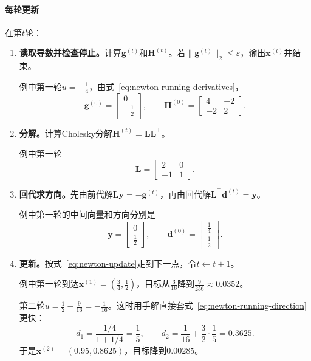 \paragraph{每轮更新}
在第$t$轮：
\begin{enumerate}
 \item \textbf{读取导数并检查停止。}计算$\bm{g}^{(t)}$和$\bm{H}^{(t)}$。若$\lVert\bm{g}^{(t)}\rVert_2\leq\varepsilon$，输出$\bm{x}^{(t)}$并结束。

 例中第一轮$u=-\tfrac14$，由式~\eqref{eq:newton-running-derivatives}，
 \[
  \bm{g}^{(0)}=\begin{bmatrix}0\\-\tfrac12\end{bmatrix},\qquad
  \bm{H}^{(0)}=\begin{bmatrix}4&-2\\-2&2\end{bmatrix}.
 \]

 \item \textbf{分解。}计算Cholesky分解$\bm{H}^{(t)}=\bm{L}\bm{L}^\top$。

 例中第一轮
 \[
  \bm{L}=\begin{bmatrix}2&0\\-1&1\end{bmatrix}.
 \]

 \item \textbf{回代求方向。}先由前代解$\bm{L}\bm{y}=-\bm{g}^{(t)}$，再由回代解$\bm{L}^\top\bm{d}^{(t)}=\bm{y}$。

 例中第一轮的中间向量和方向分别是
 \[
  \bm{y}=\begin{bmatrix}0\\\tfrac12\end{bmatrix},\qquad
  \bm{d}^{(0)}=\begin{bmatrix}\tfrac14\\\tfrac12\end{bmatrix}.
 \]

 \item \textbf{更新。}按式~\eqref{eq:newton-update}走到下一点，令$t\leftarrow t+1$。

 例中第一轮到达$\bm{x}^{(1)}=(\tfrac34,\tfrac12)$，目标从$\tfrac3{16}$降到$\tfrac9{256}\approx0.0352$。

 第二轮$u=\tfrac12-\tfrac9{16}=-\tfrac1{16}$。这时用手解直接套式~\eqref{eq:newton-running-direction}更快：
 \[
  d_1=\frac{1/4}{1+1/4}=\frac15,\qquad
  d_2=\frac1{16}+\frac32\cdot\frac15=0.3625.
 \]
 于是$\bm{x}^{(2)}=(0.95,0.8625)$，目标降到$0.00285$。
\end{enumerate}

